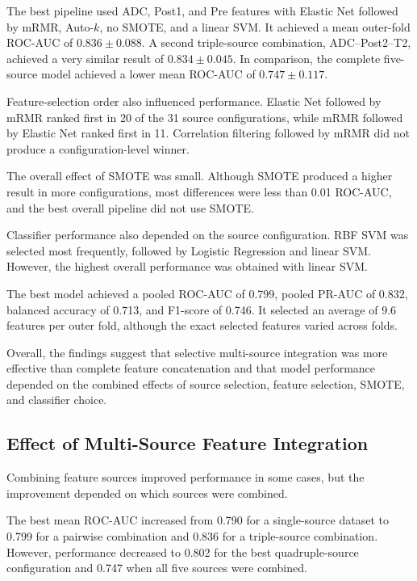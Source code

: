 \documentclass[12pt,twocolumn]{article}
\begin{document}
The best pipeline used ADC, Post1, and Pre features with Elastic Net
followed by mRMR, Auto-\(k\), no SMOTE, and a linear SVM. It achieved
a mean outer-fold ROC-AUC of \(0.836 \pm 0.088\). A second
triple-source combination, ADC--Post2--T2, achieved a very similar
result of \(0.834 \pm 0.045\). In comparison, the complete five-source
model achieved a lower mean ROC-AUC of \(0.747 \pm 0.117\).

Feature-selection order also influenced performance. Elastic Net
followed by mRMR ranked first in 20 of the 31 source configurations,
while mRMR followed by Elastic Net ranked first in 11. Correlation
filtering followed by mRMR did not produce a configuration-level
winner.

The overall effect of SMOTE was small. Although SMOTE produced a
higher result in more configurations, most differences were less than
0.01 ROC-AUC, and the best overall pipeline did not use SMOTE.

Classifier performance also depended on the source configuration.
RBF SVM was selected most frequently, followed by Logistic Regression
and linear SVM. However, the highest overall performance was obtained
with linear SVM.

The best model achieved a pooled ROC-AUC of 0.799, pooled PR-AUC of
0.832, balanced accuracy of 0.713, and F1-score of 0.746. It selected
an average of 9.6 features per outer fold, although the exact selected
features varied across folds.

Overall, the findings suggest that selective multi-source integration
was more effective than complete feature concatenation and that model
performance depended on the combined effects of source selection,
feature selection, SMOTE, and classifier choice.


\subsection{Effect of Multi-Source Feature Integration}
\label{subsec:discussion_feature_integration}

Combining feature sources improved performance in some cases, but the
improvement depended on which sources were combined.

The best mean ROC-AUC increased from 0.790 for a single-source dataset
to 0.799 for a pairwise combination and 0.836 for a triple-source
combination. However, performance decreased to 0.802 for the best
quadruple-source configuration and 0.747 when all five sources were
combined.
\end{document}
